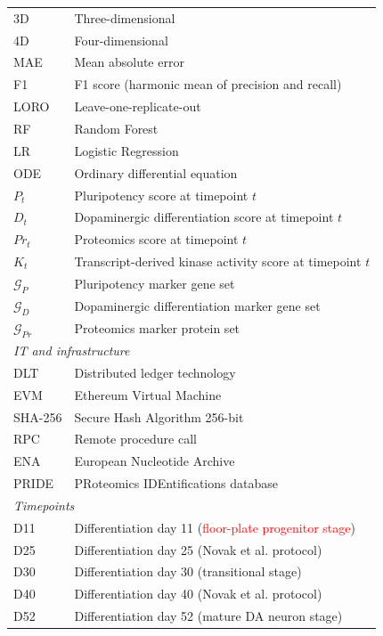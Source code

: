 \documentclass[5p,times,twocolumn]{elsarticle}
\newcommand{\rtag}[1]{}
\newcommand{\rev}[2]{\rtag{#1}\textcolor{red}{#2}}
\begin{document}
\begin{table}[!htbp]
{\begin{tabular}{p{2.7cm} p{6.2cm}}
      3D          & Three-dimensional \\
      4D          & Four-dimensional \\
      MAE         & Mean absolute error \\
      F1          & F1 score (harmonic mean of precision and recall) \\
      LORO        & Leave-one-replicate-out \\
      RF          & Random Forest \\
      LR          & Logistic Regression \\
      ODE         & Ordinary differential equation \\
      $P_t$       & Pluripotency score at timepoint $t$ \\
      $D_t$       & Dopaminergic differentiation score at timepoint $t$ \\
      $Pr_t$      & Proteomics score at timepoint $t$ \\
      $K_t$       & Transcript-derived kinase activity score at timepoint $t$ \\
      $\mathcal{G}_P$  & Pluripotency marker gene set \\
      $\mathcal{G}_D$  & Dopaminergic differentiation marker gene set \\
      $\mathcal{G}_{Pr}$ & Proteomics marker protein set \\
      \midrule
      \multicolumn{2}{l}{\textit{IT and infrastructure}} \\
      \midrule
      DLT         & Distributed ledger technology \\
      EVM         & Ethereum Virtual Machine \\
      SHA-256     & Secure Hash Algorithm 256-bit \\
      RPC         & Remote procedure call \\
      ENA         & European Nucleotide Archive \\
      PRIDE       & PRoteomics IDEntifications database \\
      \midrule
      \multicolumn{2}{l}{\textit{Timepoints}} \\
      \midrule
      D11         & Differentiation day 11 (\rev{AC}{floor-plate progenitor stage}) \\
      D25         & Differentiation day 25 (Novak et al. protocol) \\
      D30         & Differentiation day 30 (transitional stage) \\
      D40         & Differentiation day 40 (Novak et al. protocol) \\
      D52         & Differentiation day 52 (mature DA neuron stage) \\
      \bottomrule
    \end{tabular}}
\end{table}
\end{document}

